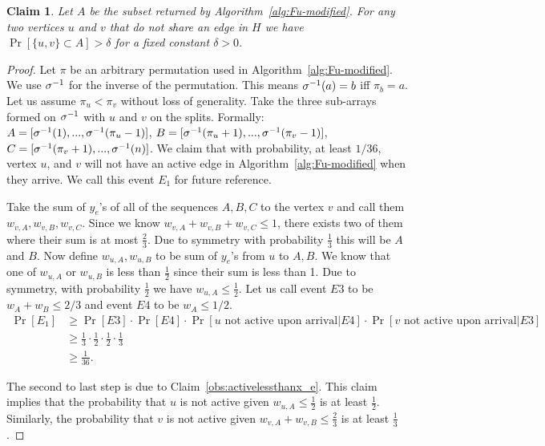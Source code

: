 \documentclass[letterpaper,11pt]{article}
\newtheorem{claim}[lemma]{Claim}
\begin{document}
\begin{claim}
    \label{claim:bothalive} Let $A$ be the subset returned by Algorithm~\ref{alg:Fu-modified}.  For any two vertices $u$ and $v$ that do not share an edge in $H$ we have $\Pr[\{u, v\}\subset A]>\delta$ for a fixed constant $\delta > 0$.
\end{claim}
\begin{proof}
Let $\pi$ be an arbitrary permutation used in Algorithm~\ref{alg:Fu-modified}. We use ${\sigma}^{-1}$ for the inverse of the permutation. This means ${\sigma}^{-1} (a) = b$ iff $\pi_b = a$. Let us assume $\pi_u < \pi_v$ without loss of generality. Take the three sub-arrays formed on ${\sigma}^{-1}$ with $u$ and $v$ on the splits. Formally: $A = [{\sigma}^{-1}(1), ..., {\sigma}^{-1}(\pi_u - 1)]$, $B = [{\sigma}^{-1}(\pi_u + 1), ..., {\sigma}^{-1}(\pi_v - 1)]$, $C = [{\sigma}^{-1}(\pi_v + 1), ..., {\sigma}^{-1}(n)]$.
We claim that with probability, at least $1/36$, vertex $u$, and $v$ will not have an active edge in Algorithm~\ref{alg:Fu-modified} when they arrive. We call this event $E_1$ for future reference. 

Take the sum of $y_e$'s of all of the sequences $A, B, C$ to the vertex $v$ and call them $w_{v,A}, w_{v, B}, w_{v, C}$. Since we know $w_{v,A} + w_{v, B} + w_{v, C} \leq 1$, there exists two of them where their sum is at most $\frac{2}{3}$. Due to symmetry with probability $\frac{1}{3}$ this will be $A$ and $B$. Now define $w_{u, A}, w_{u, B}$ to be sum of $y_e$'s from $u$ to $A, B$. We know that one of $w_{u, A}$ or $w_{u, B}$ is less than $\frac{1}{2}$ since their sum is less than 1. Due to symmetry, with probability $\frac{1}{2}$ we have $w_{u, A} \leq \frac{1}{2}$. Let us call event $E3$ to be $w_A + w_B \leq 2/3$ and event $E4$ to be $w_A \leq 1/2$.
\begin{align*}
       \Pr[E_1] & \geq \Pr[E3] \cdot \Pr[E4]\cdot \Pr[\text{$u$ not active upon arrival} | E4] \cdot \Pr[\text{$v$ not active upon arrival} | E3] \\ 
        & \geq \frac{1}{3} \cdot \frac{1}{2} \cdot \frac{1}{2} \cdot \frac{1}{3} \\
        & \geq \frac{1}{36}.
    \end{align*}


The second to last step is due to Claim~\ref{obs:activelessthanx_e}. This claim implies that the probability that $u$ is not active given $w_{u, A} \leq \frac{1}{2}$ is at least $\frac{1}{2}$. Similarly, the probability that $v$ is not active given $w_{v, A} + w_{v, B} \leq \frac{2}{3}$ is at least $\frac{1}{3}$. 



\end{proof}
\end{document}
